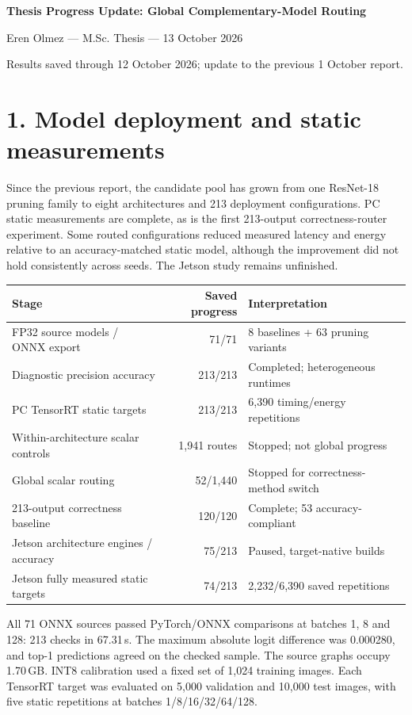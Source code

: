 \documentclass[10pt,a4paper]{article}
\newcommand{\pagehead}[1]{\section*{#1}}
\begin{document}
\begin{center}
{\Large\bfseries Thesis Progress Update: Global Complementary-Model Routing}\par
{\normalsize Eren Olmez --- M.Sc. Thesis --- 13 October 2026}\par
{\small Results saved through 12 October 2026; update to the previous 1 October report.}
\end{center}
\vspace{-0.6em}
\pagehead{1. Model deployment and static measurements}
Since the previous report, the candidate pool has grown from one ResNet-18 pruning family to eight architectures and 213 deployment configurations. PC static measurements are complete, as is the first 213-output correctness-router experiment. Some routed configurations reduced measured latency and energy relative to an accuracy-matched static model, although the improvement did not hold consistently across seeds. The Jetson study remains unfinished.

\begin{tabularx}{\linewidth}{@{}Xrl@{}}
\toprule Stage & Saved progress & Interpretation \\
\midrule
FP32 source models / ONNX export & 71/71 & 8 baselines + 63 pruning variants \\
Diagnostic precision accuracy & 213/213 & Completed; heterogeneous runtimes \\
PC TensorRT static targets & 213/213 & 6,390 timing/energy repetitions \\
Within-architecture scalar controls & 1,941 routes & Stopped; not global progress \\
Global scalar routing & 52/1,440 & Stopped for correctness-method switch \\
213-output correctness baseline & 120/120 & Complete; 53 accuracy-compliant \\
Jetson architecture engines / accuracy & 75/213 & Paused, target-native builds \\
Jetson fully measured static targets & 74/213 & 2,232/6,390 saved repetitions \\
\bottomrule
\end{tabularx}

All 71 ONNX sources passed PyTorch/ONNX comparisons at batches 1, 8 and 128: 213 checks in 67.31\,s. The maximum absolute logit difference was 0.000280, and top-1 predictions agreed on the checked sample. The source graphs occupy 1.70\,GB. INT8 calibration used a fixed set of 1,024 training images. Each TensorRT target was evaluated on 5,000 validation and 10,000 test images, with five static repetitions at batches 1/8/16/32/64/128.
\end{document}
